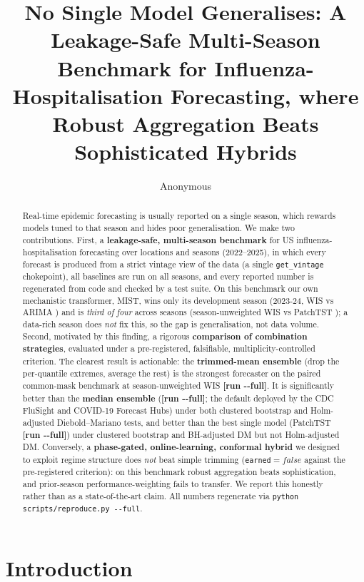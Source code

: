 \documentclass{article}
\title{No Single Model Generalises: A Leakage-Safe Multi-Season Benchmark for
Influenza-Hospitalisation Forecasting, where Robust Aggregation Beats Sophisticated Hybrids}
\author{Anonymous}
\date{}
\providecommand{\msEnsTrimmedWIS}{\textbf{[run -{}-full]}}
\providecommand{\msEnsMedianWIS}{\textbf{[run -{}-full]}}
\providecommand{\msPatchTSTWIS}{\textbf{[run -{}-full]}}
\providecommand{\hybridEarned}{false}
\begin{document}
\maketitle

\begin{abstract}
Real-time epidemic forecasting is usually reported on a single season, which rewards models
tuned to that season and hides poor generalisation. We make two contributions. First, a
\textbf{leakage-safe, multi-season benchmark} for US influenza-hospitalisation forecasting over
\nLoc{} locations and \nSeasons{} seasons (2022--2025), in which every forecast is produced from a
strict vintage view of the data (a single \texttt{get\_vintage} chokepoint), all baselines are run
on all seasons, and every reported number is regenerated from code and checked by a test suite.
On this benchmark our own mechanistic transformer, MIST, wins only its development season
(2023-24, WIS \mistWIS{} vs ARIMA \arimaWIS{}) and is \emph{third of four} across seasons
(season-unweighted WIS \seasonMistMean{} vs PatchTST \seasonPatchMean{}); a data-rich season does
\emph{not} fix this, so the gap is generalisation, not data volume. Second, motivated by this
finding, a rigorous \textbf{comparison of combination strategies}, evaluated under a pre-registered,
falsifiable, multiplicity-controlled criterion. The clearest result is actionable: the
\textbf{trimmed-mean ensemble} (drop the per-quantile extremes, average the rest) is the strongest
forecaster on the paired common-mask benchmark at season-unweighted WIS \msEnsTrimmedWIS{}.
It is significantly better than the \textbf{median ensemble} (\msEnsMedianWIS{}; the default
deployed by the CDC FluSight and COVID-19 Forecast Hubs) under both clustered bootstrap and
Holm-adjusted Diebold--Mariano tests, and better than the best single model (PatchTST
\msPatchTSTWIS{}) under clustered bootstrap and BH-adjusted DM but not Holm-adjusted DM.
Conversely, a \textbf{phase-gated, online-learning, conformal hybrid} we designed to exploit
regime structure does \emph{not} beat simple trimming (\texttt{earned}$=\hybridEarned$ against the
pre-registered criterion): on this benchmark robust aggregation beats sophistication, and prior-season
performance-weighting fails to transfer. We report this honestly rather than as a state-of-the-art
claim. All numbers regenerate via \texttt{python scripts/reproduce.py -{}-full}.
\end{abstract}

\section{Introduction}
\end{document}
